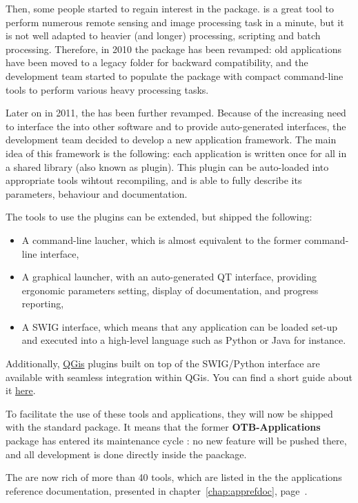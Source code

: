 Then, some people started to regain interest in the \app
package. \mont is a great tool to perform numerous remote sensing and
image processing task in a minute, but it is not well adapted to
heavier (and longer) processing, scripting and batch
processing. Therefore, in 2010 the \app package has been revamped: old
applications have been moved to a legacy folder for backward
compatibility, and the development team started to populate the
package with compact command-line tools to perform various heavy
processing tasks.

Later on in 2011, the \app has been further revamped. Because of the
increasing need to interface the \app into other software and to
provide auto-generated interfaces, the \otb development team decided
to develop a new application framework. The main idea of this
framework is the following: each application is written once for all
in a shared library (also known as plugin). This plugin can be
auto-loaded into appropriate tools wihtout recompiling, and is able to
fully describe its parameters, behaviour and documentation.

The tools to use the plugins can be extended, but \otb shipped the
following:
\begin{itemize}
\item A command-line laucher, which is almost equivalent to the former
  \app command-line interface,
\item A graphical launcher, with an auto-generated QT interface,
  providing ergonomic parameters setting, display of documentation,
  and progress reporting,
\item A SWIG interface, which means that any application can be
  loaded set-up and executed into a high-level language such as Python
  or Java for instance.
\end{itemize}

Additionally, \href{http://www.qgis.org/}{QGis} plugins built on top of the SWIG/Python interface
are available with seamless integration within QGis. You can find a short guide about it \href{http://wiki.orfeo-toolbox.org/index.php/Quantum_GIS_access_to_OTB_applications}{here}.

To facilitate the use of these tools and applications, they will now
be shipped with the standard \otb package. It means that the former
\textbf{OTB-Applications} package has entered its maintenance cycle :
no new feature will be pushed there, and all development is done directly
inside the \otb paackage.

The \app are now rich of more than 40 tools, which are listed in the
the applications reference documentation, presented in
chapter~\ref{chap:apprefdoc}, page~\pageref{chap:apprefdoc}.

